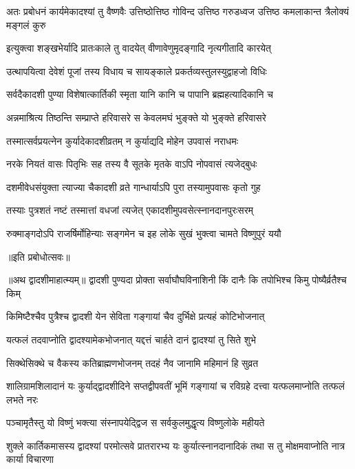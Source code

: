 \threelineshloka
{अतः प्रबोधनं कार्यमेकादश्यां तु वैष्णवैः}
{उत्तिष्ठोत्तिष्ठ गोविन्द उत्तिष्ठ गरुडध्वज}
{उत्तिष्ठ कमलाकान्त त्रैलोक्यं मङ्गलं कुरु} %

\twolineshloka
{इत्युक्त्वा शङ्खभेर्यादि प्रातःकाले तु वादयेत्}
{वीणावेणुमृदङ्गादि नृत्यगीतादि कारयेत्} %

\twolineshloka
{उत्थापयित्वा देवेशं पूजां तस्य विधाय च}
{सायङ्काले प्रकर्तव्यस्तुलस्युद्वाहजो विधिः} %

\twolineshloka
{सर्वदैकादशी पुण्या विशेषात्कार्तिकी स्मृता}
{यानि कानि च पापानि ब्रह्महत्यादिकानि च} %

\twolineshloka
{अन्नमाश्रित्य तिष्ठन्ति सम्प्राप्ते हरिवासरे}
{स केवलमघं भुङ्क्ते यो भुङ्क्ते हरिवासरे} %

\twolineshloka
{तस्मात्सर्वप्रयत्नेन कुर्यादेकादशीव्रतम्}
{न कुर्याद्यदि मोहेन उपवासं नराधमः} %

\twolineshloka
{नरके नियतं वासः पितृभिः सह तस्य वै}
{सूतके मृतके वाऽपि नोपवासं त्यजेद्बुधः} %

\twolineshloka
{दशमीवेधसंयुक्ता त्याज्या चैकादशी व्रते}
{गान्धार्याऽपि पुरा तस्यामुपवासः कृतो गुह} %

\twolineshloka
{तस्याः पुत्रशतं नष्टं तस्मात्तां वधजां त्यजेत्}
{एकादशीमुपवसेत्स्नानदानपुरःसरम्} %

\twolineshloka
{रुक्माङ्गदोऽपि राजर्षिर्मोहिन्याः सङ्गमेन च}
{इह लोके सुखं भुक्त्वा चामते विष्णुपुरं ययौ} %


॥इति प्रबोधोत्सवः॥

॥अथ द्वादशीमाहात्म्यम्॥
\twolineshloka
{द्वादशी पुण्यदा प्रोक्ता सर्वाघौघविनाशिनी}
{किं दानैः कि तपोभिश्च किमु पोष्यैर्व्रतैश्च किम्} %

\twolineshloka
{किमिष्टैश्चैव पुत्रैश्च द्वादशी येन सेविता}
{गङ्गायां चैव दुर्भिक्षे प्रत्यहं कोटिभोजनात्} %

\twolineshloka
{यत्फलं तदवाप्नोति द्वादश्यामेकभोजनात्}
{यद्दत्तं चार्हते दानं द्वादश्यां तु सिते शुभे} %

\twolineshloka
{सिक्थेसिक्थे च वैकस्य कतिब्राह्मणभोजनम्}
{तदहं नैव जानामि महिमानं हि सुव्रत} %

\threelineshloka
{शालिग्रामशिलादानं यः कुर्याद्द्वादशीदिने}
{सप्तद्वीपवतीं भूमिं गङ्गायां च रविग्रहे}
{दत्त्वा यत्फलमाप्नोति तत्फलं लभते नरः} %

\twolineshloka
{पञ्चामृतैस्तु यो विष्णुं भक्त्या संस्नापयेद्द्विज}
{स सर्वकुलमुद्धृत्य विष्णुलोके महीयते} %

\threelineshloka
{शुक्ले कार्तिकमासस्य द्वादश्यां परमोत्सवे}
{प्रातरारभ्य यः कुर्यात्स्नानदानादिकं तथा}
{स तु मोक्षमवाप्नोति नात्र कार्या विचारणा} %

